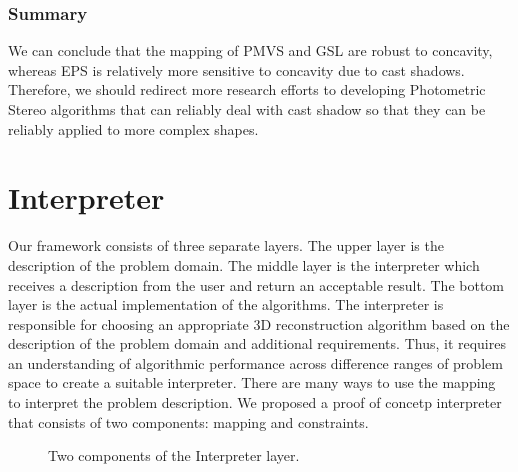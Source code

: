 \subsubsection{Summary}
We can conclude that the mapping of PMVS and GSL are robust to concavity, whereas EPS is relatively more sensitive to concavity due to cast shadows. Therefore, we should redirect more research efforts to developing Photometric Stereo algorithms that can reliably deal with cast shadow so that they can be reliably applied to more complex shapes.


\section{Interpreter}
\label{sec:interp}
Our framework consists of three separate layers. The upper layer is the description of the problem domain. The middle layer is the interpreter which receives a description from the user and return an acceptable result. The bottom layer is the actual implementation of the algorithms. The interpreter is responsible for choosing an appropriate 3D reconstruction algorithm based on the description of the problem domain and additional requirements. Thus, it requires an understanding of algorithmic performance across difference ranges of problem space to create a suitable interpreter. There are many ways to use the mapping to interpret the problem description. We proposed a proof of concetp interpreter that consists of two components: mapping and constraints.
\begin{figure}[!htbp]
\centering
{}
\caption{Two components of the Interpreter layer.}
\label{fig:interpreter_layer}
\end{figure}

